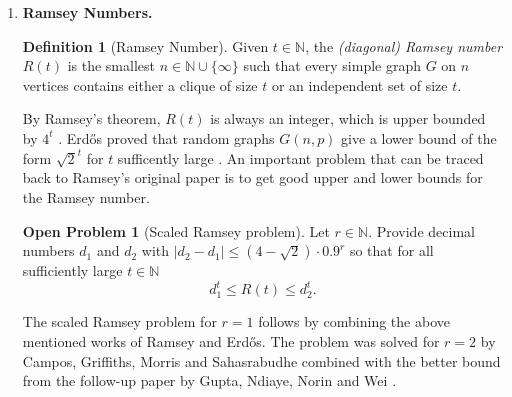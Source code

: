 \documentclass[12pt]{article}
\numberwithin{equation}{section}
\theoremstyle{definition}
\newtheorem{definition}{Definition}
\newtheorem{openproblem}[theorem]{Open Problem}
\begin{document}
\begin{enumerate}

\newpage
\item {\bf Ramsey Numbers.}
\begin{definition}[Ramsey Number]
Given $t\in \mathbb{N}$, the \emph{(diagonal) Ramsey number} \( R(t) \) is the smallest $n\in \mathbb{N}\cup \{\infty\}$ such that every simple graph \( G \) on \( n \) vertices contains either a clique of size \( t \) or an independent set of size \( t \).
\end{definition}
By Ramsey's theorem, $R(t)$ is always an integer, which is upper bounded by $4^t$ \cite{ramsey1930formal, ramseygraham1990ramsey}.
Erd\H{o}s proved that random graphs $G(n,p)$ give a lower bound of the form $\sqrt{2}^t$ for $t$ sufficently large \cite{erdos1947some}. An important problem  that can be traced back to Ramsey's original paper \cite{ramsey1930formal} is to get good upper and lower bounds for the Ramsey number.

\begin{openproblem}[Scaled Ramsey problem]
Let $r\in \mathbb{N}$.
Provide decimal numbers $d_1$ and $d_2$ with $|d_2-d_1|\leq (4-\sqrt{2}) \cdot 0.9^r$ so that for all sufficiently large $t\in \mathbb{N}$
\[
d_1^t \leq R(t) \leq d_2^t.
\]
\end{openproblem}

The scaled Ramsey problem for $r=1$ follows by combining the above mentioned works of Ramsey and Erd\H{o}s.
The problem was solved for $r=2$ by Campos, Griffiths, Morris  and Sahasrabudhe
\cite{campos2026exponential} combined with the better bound from the follow-up paper by 
Gupta, Ndiaye, Norin and Wei \cite{gupta2024optimizing}.


\end{enumerate}
\end{document}
